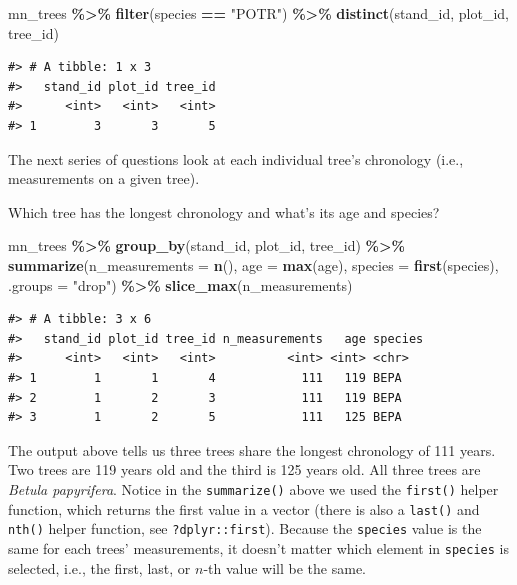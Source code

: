 \documentclass[
  11pt,
]{krantz}
\newenvironment{Shaded}{\begin{snugshade}}{\end{snugshade}}
\newcommand{\DataTypeTok}[1]{\textcolor[rgb]{0.13,0.29,0.53}{#1}}
\newcommand{\KeywordTok}[1]{\textcolor[rgb]{0.13,0.29,0.53}{\textbf{#1}}}
\newcommand{\NormalTok}[1]{#1}
\newcommand{\OperatorTok}[1]{\textcolor[rgb]{0.81,0.36,0.00}{\textbf{#1}}}
\newcommand{\StringTok}[1]{\textcolor[rgb]{0.31,0.60,0.02}{#1}}
\theoremstyle{definition}
\theoremstyle{definition}
\theoremstyle{definition}
\theoremstyle{definition}
\theoremstyle{remark}
\begin{document}
\begin{Shaded}
\begin{Highlighting}[]
\NormalTok{mn\_trees }\OperatorTok{\%\textgreater{}\%}\StringTok{ }\KeywordTok{filter}\NormalTok{(species }\OperatorTok{==}\StringTok{ "POTR"}\NormalTok{) }\OperatorTok{\%\textgreater{}\%}\StringTok{ }
\StringTok{  }\KeywordTok{distinct}\NormalTok{(stand\_id, plot\_id, tree\_id)}
\end{Highlighting}
\end{Shaded}

\begin{verbatim}
#> # A tibble: 1 x 3
#>   stand_id plot_id tree_id
#>      <int>   <int>   <int>
#> 1        3       3       5
\end{verbatim}

The next series of questions look at each individual tree's chronology (i.e., measurements on a given tree).

Which tree has the longest chronology and what's its age and species?

\begin{Shaded}
\begin{Highlighting}[]
\NormalTok{mn\_trees }\OperatorTok{\%\textgreater{}\%}\StringTok{ }\KeywordTok{group\_by}\NormalTok{(stand\_id, plot\_id, tree\_id) }\OperatorTok{\%\textgreater{}\%}\StringTok{ }
\StringTok{  }\KeywordTok{summarize}\NormalTok{(}\DataTypeTok{n\_measurements =} \KeywordTok{n}\NormalTok{(), }
            \DataTypeTok{age =} \KeywordTok{max}\NormalTok{(age), }
            \DataTypeTok{species =} \KeywordTok{first}\NormalTok{(species),}
            \DataTypeTok{.groups =} \StringTok{"drop"}\NormalTok{) }\OperatorTok{\%\textgreater{}\%}\StringTok{ }
\StringTok{  }\KeywordTok{slice\_max}\NormalTok{(n\_measurements)}
\end{Highlighting}
\end{Shaded}

\begin{verbatim}
#> # A tibble: 3 x 6
#>   stand_id plot_id tree_id n_measurements   age species
#>      <int>   <int>   <int>          <int> <int> <chr>  
#> 1        1       1       4            111   119 BEPA   
#> 2        1       2       3            111   119 BEPA   
#> 3        1       2       5            111   125 BEPA
\end{verbatim}

The output above tells us three trees share the longest chronology of 111 years. Two trees are 119 years old and the third is 125 years old. All three trees are \emph{Betula papyrifera}. Notice in the \texttt{summarize()} above we used the \texttt{first()} helper function, which returns the first value in a vector (there is also a \texttt{last()} and \texttt{nth()} helper function, see \texttt{?dplyr::first}). Because the \texttt{species} value is the same for each trees' measurements, it doesn't matter which element in \texttt{species} is selected, i.e., the first, last, or \(n\)-th value will be the same.
\end{document}
